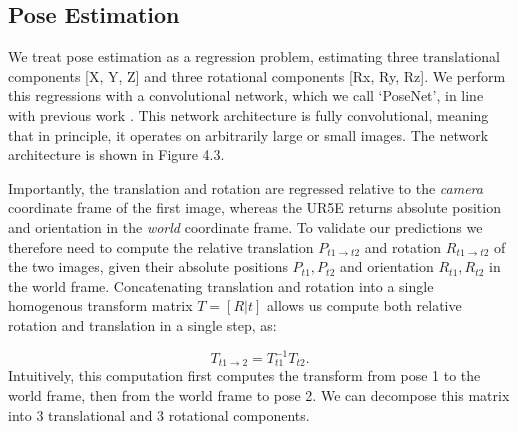 \subsection{Pose Estimation}

We treat pose estimation as a regression problem, estimating three translational components [X, Y, Z] and three rotational components [Rx, Ry, Rz]. We perform this regressions with a convolutional network, which we call `PoseNet', in line with previous work \cite{zhan2018deepfeature,bian2019consistency,zhou2017unsupervised}. This network architecture is fully convolutional, meaning that in principle, it operates on arbitrarily large or small images. The network architecture is shown in Figure 4.3.



Importantly, the translation and rotation are regressed relative to the \textit{camera} coordinate frame of the first image, whereas the UR5E returns absolute position and orientation in the \textit{world} coordinate frame. To validate our predictions we therefore need to compute the relative translation $P_{t1 \rightarrow t2}$ and rotation $R_{t1 \rightarrow t2}$ of the two images, given their absolute positions $P_{t1}, P_{t2}$ and orientation $R_{t1}, R_{t2}$ in the world frame. Concatenating translation and rotation into a single homogenous transform matrix $T = [R|t]$ allows us compute both relative rotation and translation in a single step, as:

\begin{equation}
T_{t1 \rightarrow 2} = T_{t1}^{-1} T_{t2}.
\end{equation} Intuitively, this computation first computes the transform from pose 1 to the world frame, then from the world frame to pose 2. We can decompose this matrix into 3 translational and 3 rotational components. 

